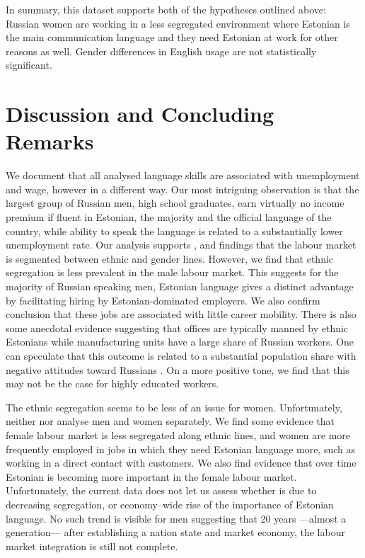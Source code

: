 \documentclass[12pt, a4paper]{article}
\begin{document}
In summary, this dataset supports both of the hypotheses outlined above: Russian women are
working in a less segregated environment where Estonian is the main
communication language and they need Estonian at work for other reasons as
well. Gender differences in English usage are not statistically
significant.


\section{Discussion and Concluding Remarks}
\label{sec:discussion}

We document that all analysed language skills are associated with
unemployment and wage, however in a different way. Our most
intriguing observation is that the largest group of
Russian men, high school graduates, earn virtually no income premium if fluent in Estonian,
the majority and the official language of the country, while ability
to speak the language is related to a substantially
lower unemployment rate.
Our analysis supports \citet{YaoandOurs2015}, and \citet{Lindemann2013} findings that 
the labour market is segmented between ethnic and gender lines.
However, we find that ethnic segregation is less prevalent in the male
labour market.
This suggests for the majority of Russian speaking men, Estonian
language gives a distinct advantage by facilitating hiring by
Estonian-dominated employers. We also confirm
\citet{leppik+vihalemm2015JofBaltStud} conclusion that
these
jobs are associated with little career mobility. There is also some
anecdotal evidence suggesting that offices are
typically manned by ethnic Estonians while manufacturing units have a
large share of Russian workers.
One can speculate that this outcome is related to a substantial population share
with negative attitudes toward Russians \citep{korts2009JofBaltStud}.
On a more positive tone, we find
that this may not be the case for highly educated workers.

The ethnic segregation seems to be less of an issue for women.
Unfortunately, neither \citet{Toomet2011} nor
\citet{leppik+vihalemm2015JofBaltStud} analyse men and women
separately. We find some evidence that female labour market is less
segregated along ethnic lines, and women are more frequently employed in jobs in which they need Estonian
language more, such as working in a direct contact with customers.
We also find evidence that over time Estonian is becoming more
important in the female labour market. Unfortunately, the current data
does not let us assess whether is due to decreasing segregation, or
economy--wide rise of the importance of Estonian language. No such trend is visible for
men suggesting that 20 years ---almost a generation--- after
establishing a nation state and market economy, the
labour market integration is still not complete.
\end{document}
